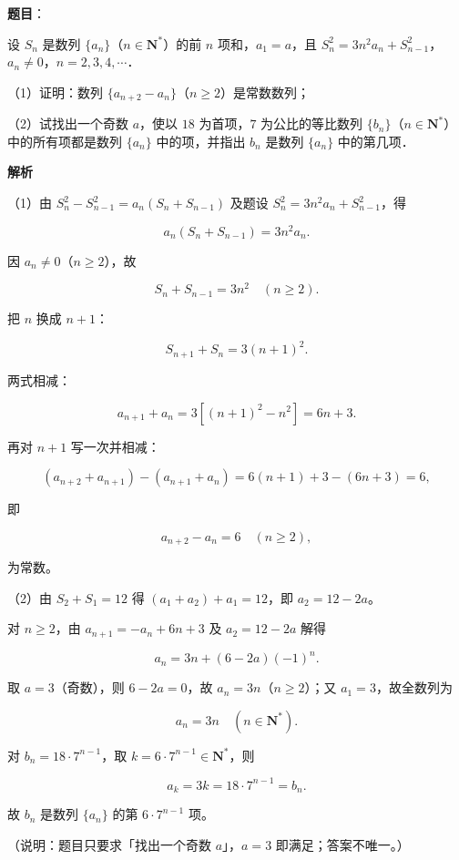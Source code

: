 \begin{answer}

\textbf{题目}：

设 $S_n$ 是数列 $\{a_n\}$（$n\in\mathbf N^*$）的前 $n$ 项和，$a_1=a$，且 $S_n^2=3n^2a_n+S_{n-1}^2$，$a_n\neq0$，$n=2,3,4,\cdots$．

（1）证明：数列 $\{a_{n+2}-a_n\}$（$n\geqslant2$）是常数数列；

（2）试找出一个奇数 $a$，使以 $18$ 为首项，$7$ 为公比的等比数列 $\{b_n\}$（$n\in\mathbf N^*$）中的所有项都是数列 $\{a_n\}$ 中的项，并指出 $b_n$ 是数列 $\{a_n\}$ 中的第几项．

\textbf{解析}

（1）由 $S_n^2-S_{n-1}^2=a_n(S_n+S_{n-1})$ 及题设 $S_n^2=3n^2a_n+S_{n-1}^2$，得

\nopagebreak[4]
\[a_n(S_n+S_{n-1})=3n^2a_n .\]

因 $a_n\neq0$（$n\geqslant2$），故

\nopagebreak[4]
\[S_n+S_{n-1}=3n^2\quad(n\geqslant2).\]

把 $n$ 换成 $n+1$：

\nopagebreak[4]
\[S_{n+1}+S_n=3(n+1)^2 .\]

两式相减：

\nopagebreak[4]
\[a_{n+1}+a_n=3\left[(n+1)^2-n^2\right]=6n+3 .\]

再对 $n+1$ 写一次并相减：

\nopagebreak[4]
\[(a_{n+2}+a_{n+1})-(a_{n+1}+a_n)=6(n+1)+3-(6n+3)=6,\]

即

\nopagebreak[4]
\[a_{n+2}-a_n=6\quad(n\geqslant2),\]

为常数。

（2）由 $S_2+S_1=12$ 得 $(a_1+a_2)+a_1=12$，即 $a_2=12-2a$。

对 $n\geqslant2$，由 $a_{n+1}=-a_n+6n+3$ 及 $a_2=12-2a$ 解得

\nopagebreak[4]
\[a_n=3n+(6-2a)(-1)^n .\]

取 $a=3$（奇数），则 $6-2a=0$，故 $a_n=3n$（$n\geqslant2$）；又 $a_1=3$，故全数列为

\nopagebreak[4]
\[a_n=3n\quad(n\in\mathbf N^*).\]

对 $b_n=18\cdot7^{n-1}$，取 $k=6\cdot7^{n-1}\in\mathbf N^*$，则

\nopagebreak[4]
\[a_k=3k=18\cdot7^{n-1}=b_n .\]

故 $b_n$ 是数列 $\{a_n\}$ 的第 $6\cdot7^{n-1}$ 项。

（说明：题目只要求「找出一个奇数 $a$」，$a=3$ 即满足；答案不唯一。）


\end{answer}
